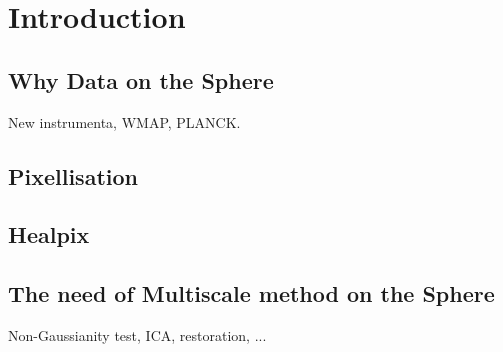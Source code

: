 
\chapter{Introduction}
\label{ch_intro}

\section{Why Data on the Sphere}
New instrumenta, WMAP, PLANCK.

\section{Pixellisation}

\section{Healpix}

\section{The need of Multiscale method on the Sphere}
 Non-Gaussianity test, ICA, restoration, ... 

